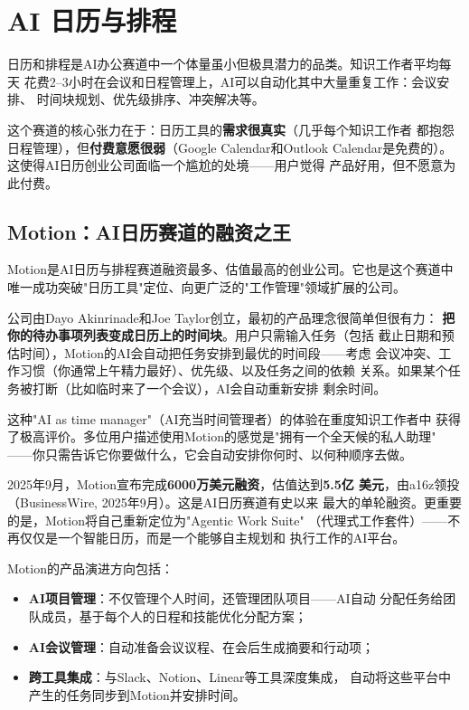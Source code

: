 \section{AI 日历与排程}
\label{sec:cprod-calendar}

日历和排程是AI办公赛道中一个体量虽小但极具潜力的品类。知识工作者平均每天
花费2--3小时在会议和日程管理上，AI可以自动化其中大量重复工作：会议安排、
时间块规划、优先级排序、冲突解决等。

这个赛道的核心张力在于：日历工具的\textbf{需求很真实}（几乎每个知识工作者
都抱怨日程管理），但\textbf{付费意愿很弱}（Google Calendar和Outlook
Calendar是免费的）。这使得AI日历创业公司面临一个尴尬的处境——用户觉得
产品好用，但不愿意为此付费。

\subsection{Motion：AI日历赛道的融资之王}
\label{subsec:motion}

Motion是AI日历与排程赛道融资最多、估值最高的创业公司。它也是这个赛道中
唯一成功突破"日历工具"定位、向更广泛的"工作管理"领域扩展的公司。

公司由Dayo Akinrinade和Joe Taylor创立，最初的产品理念很简单但很有力：
\textbf{把你的待办事项列表变成日历上的时间块}。用户只需输入任务（包括
截止日期和预估时间），Motion的AI会自动把任务安排到最优的时间段——考虑
会议冲突、工作习惯（你通常上午精力最好）、优先级、以及任务之间的依赖
关系。如果某个任务被打断（比如临时来了一个会议），AI会自动重新安排
剩余时间。

这种"AI as time manager"（AI充当时间管理者）的体验在重度知识工作者中
获得了极高评价。多位用户描述使用Motion的感觉是"拥有一个全天候的私人助理"
——你只需告诉它你要做什么，它会自动安排你何时、以何种顺序去做。

2025年9月，Motion宣布完成\textbf{6000万美元融资}，估值达到\textbf{5.5亿
美元}，由a16z领投（BusinessWire, 2025年9月）。这是AI日历赛道有史以来
最大的单轮融资。更重要的是，Motion将自己重新定位为"Agentic Work Suite"
（代理式工作套件）——不再仅仅是一个智能日历，而是一个能够自主规划和
执行工作的AI平台。

Motion的产品演进方向包括：
\begin{itemize}
  \item \textbf{AI项目管理}：不仅管理个人时间，还管理团队项目——AI自动
    分配任务给团队成员，基于每个人的日程和技能优化分配方案；
  \item \textbf{AI会议管理}：自动准备会议议程、在会后生成摘要和行动项；
  \item \textbf{跨工具集成}：与Slack、Notion、Linear等工具深度集成，
    自动将这些平台中产生的任务同步到Motion并安排时间。
\end{itemize}

